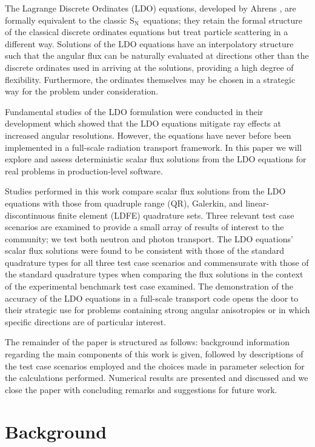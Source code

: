 \documentclass{article} %
\newcommand{\sn}{S$_\mathrm{N}$}
\begin{document}
The Lagrange Discrete Ordinates (LDO) equations, developed by Ahrens
\cite{ahrens}, are formally equivalent to the classic \sn\ equations; they
retain the formal structure of the classical discrete ordinates equations but
treat particle scattering in a different way. Solutions of the LDO equations
have an interpolatory structure such that the angular flux can be naturally
evaluated at directions other than the discrete ordinates used in arriving at
the solutions, providing a high degree of flexibility. Furthermore, the
ordinates themselves may be chosen in a strategic way for the problem under
consideration.

Fundamental studies of the LDO formulation were conducted in their development
which showed that the LDO equations mitigate ray effects at increased angular
resolutions. However, the equations have never before been implemented in a
full-scale radiation transport framework. In this paper we will explore and
assess deterministic scalar flux solutions from the LDO equations for real
problems in production-level software.

Studies performed in this work compare scalar flux solutions from the LDO
equations with those from quadruple range (QR), Galerkin, and linear-
discontinuous finite element (LDFE) quadrature sets. Three relevant test case
scenarios are examined to provide a small array of results of interest to the
community; we test both neutron and photon transport. The LDO equations'
scalar flux solutions were found to be consistent with those of the standard
quadrature types for all three test case scenarios and commensurate with
those of the standard quadrature types when comparing the flux solutions in
the context of the experimental benchmark test case examined. The
demonstration of the accuracy of the LDO equations in a full-scale transport
code opens the door to their strategic use for problems containing strong
angular anisotropies or in which specific directions are of particular
interest.

The remainder of the paper is structured as follows: background information
regarding the main components of this work is given, followed by descriptions
of the test case scenarios employed and the choices made in parameter selection
for the calculations performed. Numerical results are presented and discussed
and we close the paper with concluding remarks and suggestions for future work.

\section{Background}
\label{sec:background}
\end{document}
